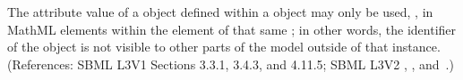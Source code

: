 The  attribute value of a \LocalParameter object defined within a
\KineticLaw object may only be used, , in MathML  elements within
the  element of that same \KineticLaw; in other words, the
identifier of the \LocalParameter object is not visible to other parts of
the model outside of that \Reaction instance.    (References: SBML L3V1 Sections 3.3.1, 3.4.3, and 4.11.5; SBML L3V2
, ,
and~.)
